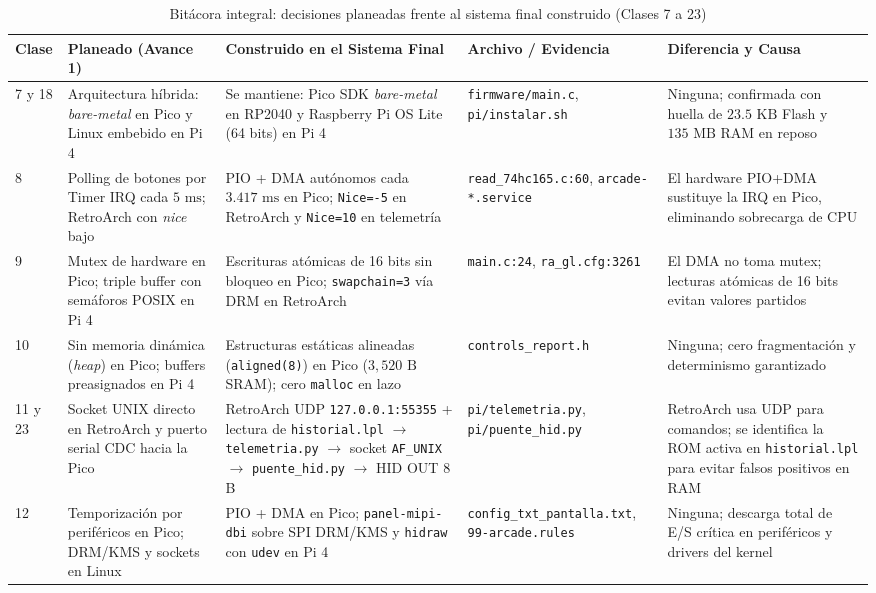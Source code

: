 \documentclass[conference]{IEEEtran}
\begin{document}
\begin{table}[!t]
	\centering
	\caption{Bitácora integral: decisiones planeadas frente al sistema final construido (Clases 7 a 23)}
	\label{tab:bitacora_completa}
	\scriptsize
	\begin{tabular}{|p{0.9cm}|p{3.4cm}|p{4.2cm}|p{3.1cm}|p{3.8cm}|}
		\hline
		\textbf{Clase} & \textbf{Planeado (Avance 1)} & \textbf{Construido en el Sistema Final} & \textbf{Archivo / Evidencia} & \textbf{Diferencia y Causa} \\
		\hline
		7 y 18 & Arquitectura híbrida: \textit{bare-metal} en Pico y Linux embebido en Pi 4 & Se mantiene: Pico SDK \textit{bare-metal} en RP2040 y Raspberry Pi OS Lite (64 bits) en Pi 4 & \texttt{firmware/main.c}, \texttt{pi/instalar.sh} & Ninguna; confirmada con huella de $23.5\text{ KB}$ Flash y $135\text{ MB}$ RAM en reposo \\
		\hline
		8 & Polling de botones por Timer IRQ cada $5\text{ ms}$; RetroArch con \textit{nice} bajo & PIO + DMA autónomos cada $3.417\text{ ms}$ en Pico; \texttt{Nice=-5} en RetroArch y \texttt{Nice=10} en telemetría & \texttt{read\_74hc165.c:60}, \texttt{arcade-*.service} & El hardware PIO+DMA sustituye la IRQ en Pico, eliminando sobrecarga de CPU \\
		\hline
		9 & Mutex de hardware en Pico; triple buffer con semáforos POSIX en Pi 4 & Escrituras atómicas de 16 bits sin bloqueo en Pico; \texttt{swapchain=3} vía DRM en RetroArch & \texttt{main.c:24}, \texttt{ra\_gl.cfg:3261} & El DMA no toma mutex; lecturas atómicas de 16 bits evitan valores partidos \\
		\hline
		10 & Sin memoria dinámica (\textit{heap}) en Pico; buffers preasignados en Pi 4 & Estructuras estáticas alineadas (\texttt{aligned(8)}) en Pico ($3{,}520\text{ B}$ SRAM); cero \texttt{malloc} en lazo & \texttt{controls\_report.h} & Ninguna; cero fragmentación y determinismo garantizado \\
		\hline
		11 y 23 & Socket UNIX directo en RetroArch y puerto serial CDC hacia la Pico & RetroArch UDP \texttt{127.0.0.1:55355} + lectura de \texttt{historial.lpl} $\rightarrow$ \texttt{telemetria.py} $\rightarrow$ socket \texttt{AF\_UNIX} $\rightarrow$ \texttt{puente\_hid.py} $\rightarrow$ HID OUT 8 B & \texttt{pi/telemetria.py}, \texttt{pi/puente\_hid.py} & RetroArch usa UDP para comandos; se identifica la ROM activa en \texttt{historial.lpl} para evitar falsos positivos en RAM \\
		\hline
		12 & Temporización por periféricos en Pico; DRM/KMS y sockets en Linux & PIO + DMA en Pico; \texttt{panel-mipi-dbi} sobre SPI DRM/KMS y \texttt{hidraw} con \texttt{udev} en Pi 4 & \texttt{config\_txt\_pantalla.txt}, \texttt{99-arcade.rules} & Ninguna; descarga total de E/S crítica en periféricos y drivers del kernel \\

\end{tabular}
\end{table}
\end{document}
